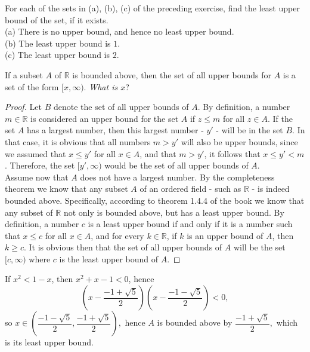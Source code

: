 \documentclass[12pt]{book}
\newenvironment{theorem}[2][Theorem]{\begin{trivlist}
\item[\hskip \labelsep {\bfseries #1}\hskip \labelsep {\bfseries #2.}]}{\end{trivlist}}
\newenvironment{exercise}[2][Exercise]{\begin{trivlist}
\item[\hskip \labelsep {\bfseries #1}\hskip \labelsep {\bfseries #2.}]}{\end{trivlist}}
\begin{document}
\begin{exercise}{1.4.2}
For each of the sets in (a), (b), (c) of the preceding exercise, find the least upper bound of the set, if it exists.\\

(a) There is no upper bound, and hence no least upper bound. \\
(b) The least upper bound is $1$.\\
(c) The least upper bound is $2$.
\end{exercise}



\begin{theorem}{1.4.3}
If a subset $A$ of $\mathbb{R}$ is bounded above, then the set of all upper bounds for $A$ is a set of the form $[x, \infty)$. \emph{What is $x$}?
\end{theorem}

\begin{proof}
Let $B$ denote the set of all upper bounds of $A$. By definition, a number $m \in \mathbb{R}$ is considered an upper bound for the set $A$ if $z \leq m$ for all $z \in A$. If the set $A$ has a largest number, then this largest number - $y'$ - will be in the set $B$. In that case, it is obvious that all numbers $m > y'$ will also be upper bounds, since we assumed that $x \leq y'$ for all $x \in A$, and that $m > y'$, it follows that $x \leq y' < m$. Therefore, the set $[y', \infty)$ would be the set of all upper bounds of $A$. \\
Assume now that $A$ does not have a largest number. By the completeness theorem we know that any subset $A$ of an ordered field - such as $\mathbb{R}$ - is indeed bounded above. Specifically, according to theorem 1.4.4 of the book we know that any subset of $\mathbb{R}$ not only is bounded above, but has a least upper bound. By definition, a number $c$ is a least upper bound if and only if it is a number such that $x \leq c$ for all $x \in A$, and for every $k \in \mathbb{R}$, if $k$ is an upper bound of $A$, then $k \geq c$. It is obvious then that the set of all upper bounds of $A$ will be the set $[c, \infty)$ where $c$ is the least upper bound of $A$.
\end{proof}


\begin{exercise}{1.4.4}
If $x^2 < 1-x$, then $x^2 + x - 1 < 0$, hence $$\left( x- \dfrac{-1 + \sqrt{5}}{2} \right) \left( x - \dfrac{-1 - \sqrt{5}}{2} \right) < 0,$$ so $x \in \left( \dfrac{-1 - \sqrt{5}}{2}, \dfrac{-1 + \sqrt{5}}{2} \right),$ hence $A$ is bounded above by $\dfrac{-1 + \sqrt{5}}{2},$ which is its least upper bound.
\end{exercise}
\end{document}
